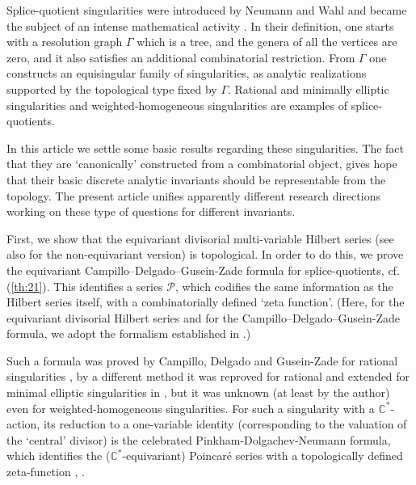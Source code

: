 \documentclass[10pt,a4paper]{amsart}
\numberwithin{equation}{section}
\numberwithin{equation}{subsection}
\theoremstyle{plain}
\theoremstyle{definition}
\begin{document}
Splice-quotient singularities were introduced by Neumann and Wahl
 and became the subject of an intense mathematical
activity
\cite{MR1900786,MR1981612,NWuj2,NWuj,Graph,Wahl2006,OkumaRat,Ouac-c,Opg,NO1,NO2,BN,Stev}.
In their definition, one starts with a resolution graph $\Gamma$
which is a tree, and the genera of all the vertices are zero, and
it also satisfies an additional combinatorial restriction. 
From $\Gamma$  one constructs an equisingular
family of singularities, as analytic realizations supported by the
topological type fixed by $\Gamma$. Rational and minimally
elliptic singularities  \cite{Ouac-c}  and weighted-homogeneous
singularities \cite{Neu} are examples of splice-quotients.

In this article we settle some basic results regarding these
singularities. The fact that they are `canonically' constructed from a
combinatorial object, gives hope that their basic discrete analytic
invariants should be representable from the topology. The present
article unifies apparently different research directions working on
these type of questions for different invariants.

First, we show that the equivariant divisorial multi-variable
Hilbert series \cite{CDGEq,CDGb} (see also \cite{CHR,CDG} for the
non-equivariant version) is topological. In order to do this, we
prove the equivariant Campillo--Delgado--Gusein-Zade formula for
splice-quotients, cf.  (\ref{th:21}). This
identifies a series ${\mathcal{P}}$, which codifies the same information as
the Hilbert series itself, with a combinatorially defined  `zeta
function'. (Here, for the equivariant divisorial Hilbert series
and for the Campillo--Delgado--Gusein-Zade formula, we adopt the
formalism established in \cite{CDGb}.)

Such a formula was proved  by Campillo, Delgado and Gusein-Zade
for rational singularities \cite{CDG,CDGEq}, by a different method
it was reproved for rational and extended for minimal elliptic
singularities  in \cite{CDGb}, but it was unknown (at least by the
author) even for weighted-homogeneous singularities. For such a
singularity with a ${\mathbb{C}}^*$-action, its reduction to a
one-variable identity (corresponding to the valuation of the
`central' divisor) is the celebrated  Pinkham-Dolgachev-Neumann
formula, which identifies the (${\mathbb{C}}^*$-equivariant) Poincar\'e
series with a topologically defined zeta-function
\cite[(5.7)]{Pi1}, \cite{Neu}.
\end{document}

